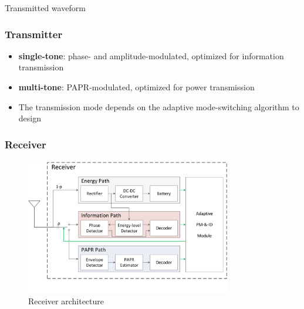 \documentclass{beamer}
\begin{document}
\begin{frame}

\begin{block}{Transmitted waveform}
\frametitle{Transmitter}

\begin{itemize}
  \item \textbf{single-tone}: phase- and amplitude-modulated, optimized for information transmission
  \item \textbf{multi-tone}: PAPR-modulated, optimized for power transmission
  \item The transmission mode depends on the adaptive mode-switching algorithm to design
\end{itemize}
\end{block}

\end{frame}


\begin{frame}
\frametitle{Receiver}

\begin{figure}
  \centering
    \includegraphics[width=0.8\textwidth]{receiver}
  \caption{Receiver architecture \cite{Park2018}}
  \label{fig:receiver}
\end{figure}

\end{frame}
\end{document}
